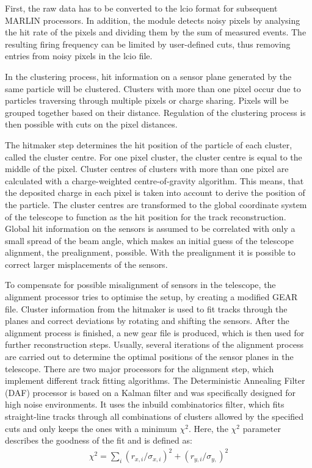 First, the raw data has to be converted to the lcio format for subsequent MARLIN processors. In addition, the module detects noisy pixels by analysing the
hit rate of the pixels and dividing them by the sum of measured events. The resulting firing frequency can be limited by user-defined cuts, thus removing entries
from noisy pixels in the lcio file.

In the clustering process, hit information on a sensor plane generated by the same particle will be clustered. Clusters with more than one pixel occur due to
particles traversing through multiple pixels or charge sharing. Pixels will be grouped together based on their distance.
Regulation of the clustering process is then possible with cuts on the pixel distances.

The hitmaker step determines the hit position of the particle of each cluster, called the cluster centre. For one pixel cluster, the cluster centre is equal to the middle of
the pixel. Cluster centres of clusters with more than one pixel are calculated with a charge-weighted centre-of-gravity algorithm. This means, that
the deposited charge in each pixel is taken into account to derive the position of the particle. The cluster centres are transformed to the global coordinate
system of the telescope to function as the hit position for the track reconstruction. Global hit information on the sensors is assumed to be correlated with only
a small spread of the beam angle, which makes an initial guess of the telescope alignment, the prealignment, possible. With the prealignment it is possible
to correct larger misplacements of the sensors.

To compensate for possible misalignment of sensors in the telescope, the alignment processor tries to optimise the setup, by creating a modified GEAR file.
Cluster information from the hitmaker
is used to fit tracks through the planes and correct deviations by rotating and shifting the sensors. After the alignment process is finished, a new gear file is produced, which
is then used for further reconstruction steps. Usually, several iterations of the alignment process are carried out to determine the optimal positions of the sensor planes
in the telescope.
There are two major processors for the alignment step, which implement different track fitting algorithms.
The Deterministic Annealing Filter (DAF) processor is based on a Kalman filter \cite{kalman} and was specifically designed for high noise environments. It uses the inbuild combinatorics filter, which fits
straight-line tracks through all combinations of clusters allowed by the specified cuts and only keeps the ones with a minimum $\chi^2$. Here, the $\chi^2$ parameter
describes the goodness of the fit and is defined as:
\begin{align} \label{eqn:chi}
  \chi^2 = \sum_i (r_{x,i}/\sigma_{x,i})^2 + (r_{y,i}/\sigma_{y,})^2
\end{align}


